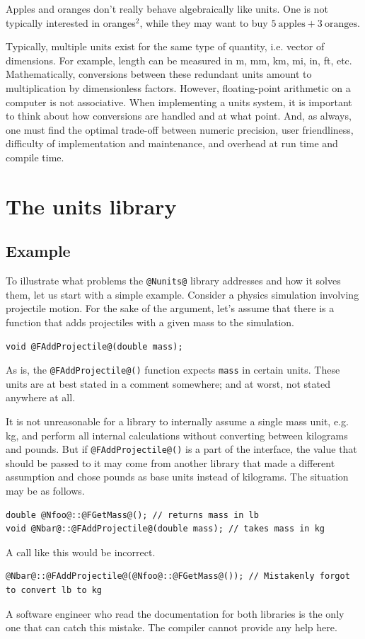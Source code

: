 \documentclass[11pt,letterpaper]{article}
\makeatletter
\newcommand{\lib}{\lstinline{@Nunits@} library}
\makeatother
\begin{document}
Apples and oranges don't really behave algebraically like units. One is not typically interested in
oranges$^2$, while they may want to buy $5~\text{apples} + 3~\text{oranges}$.

Typically, multiple units exist for the same type of quantity, i.e. vector of dimensions. For
example, length can be measured in m, mm, km, mi, in, ft, etc. Mathematically, conversions between
these redundant units amount to multiplication by dimensionless factors. However, floating-point
arithmetic on a computer is not associative. When implementing a units system, it is important to
think about how conversions are handled and at what point. And, as always, one must find the optimal
trade-off between numeric precision, user friendliness, difficulty of implementation and
maintenance, and overhead at run time and compile time.

\section{The units library}\label{sec:lib} %

\subsection{Example}\label{sec:example} %

To illustrate what problems the \lib{} addresses and how it solves them,
let us start with a simple example.
Consider a physics simulation involving projectile motion.
For the sake of the argument, let's assume that there is a function that adds projectiles with a
given mass to the simulation.

\begin{lstlisting}
void @FAddProjectile@(double mass);
\end{lstlisting}

As is, the \lstinline{@FAddProjectile@()} function expects \lstinline{mass} in certain units.
These units are at best stated in a comment somewhere; and at worst, not stated anywhere at all.

It is not unreasonable for a library to internally assume a single mass unit, e.g. kg,
and perform all internal calculations without converting between kilograms and pounds.
But if \lstinline{@FAddProjectile@()} is a part of the interface, the value that should be passed to
it may come from another library that made a different assumption and chose pounds as base units
instead of kilograms. The situation may be as follows.
%
\begin{lstlisting}
double @Nfoo@::@FGetMass@(); // returns mass in lb
void @Nbar@::@FAddProjectile@(double mass); // takes mass in kg
\end{lstlisting}
%
A call like this would be incorrect.
%
\begin{lstlisting}
@Nbar@::@FAddProjectile@(@Nfoo@::@FGetMass@()); // Mistakenly forgot to convert lb to kg
\end{lstlisting}
%
A software engineer who read the documentation for both libraries is the only one that can catch
this mistake.
The compiler cannot provide any help here.
\end{document}
